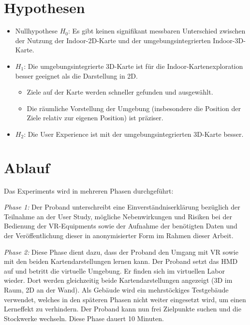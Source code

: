 \documentclass[
    draft=false,
    paper=a4,
    fontsize=11pt,
    twoside=false,
    captions=tableheading,
    british, ngerman,
]{scrartcl}
\begin{document}
\section*{Hypothesen}
\begin{itemize}
    \item Nullhypothese $H_0$: Es gibt keinen signifikant messbaren Unterschied zwischen der Nutzung der Indoor-2D-Karte und der umgebungsintegrierten Indoor-3D-Karte.
    \item $H_1$: Die umgebungsintegrierte 3D-Karte ist für die Indoor-Kartenexploration besser geeignet als die Darstellung in 2D.
    \begin{itemize}
        \item Ziele auf der Karte werden schneller gefunden und ausgewählt.
        \item Die räumliche Vorstellung der Umgebung (insbesondere die Position der Ziele relativ zur eigenen Position) ist präziser.
    \end{itemize}
    \item $H_2$: Die User Experience ist mit der umgebungsintegrierten 3D-Karte besser.
\end{itemize}

\section*{Ablauf}
Das Experiments wird in mehreren Phasen durchgeführt:

\vspace{1em}
\noindent
\textit{Phase 1:}
Der Proband unterschreibt eine Einverständniserklärung bezüglich der Teilnahme an der User Study, mögliche Nebenwirkungen und Risiken bei der Bedienung der VR-Equipments sowie der Aufnahme der benötigten Daten und der Veröffentlichung dieser in anonymisierter Form im Rahmen dieser Arbeit.

\vspace{1em}
\noindent
\textit{Phase 2:}
Diese Phase dient dazu, dass der Proband den Umgang mit VR sowie mit den beiden Kartendarstellungen lernen kann.
Der Proband setzt das HMD auf und betritt die virtuelle Umgebung.
Er finden sich im virtuellen Labor wieder.
Dort werden gleichzeitig beide Kartendarstellungen angezeigt (3D im Raum, 2D an der Wand).
Als Gebäude wird ein mehrstöckiges Testgebäude verwendet, welches in den späteren Phasen nicht weiter eingesetzt wird, um einen Lerneffekt zu verhindern.
Der Proband kann nun frei Zielpunkte suchen und die Stockwerke wechseln.
Diese Phase dauert 10 Minuten.
\end{document}
